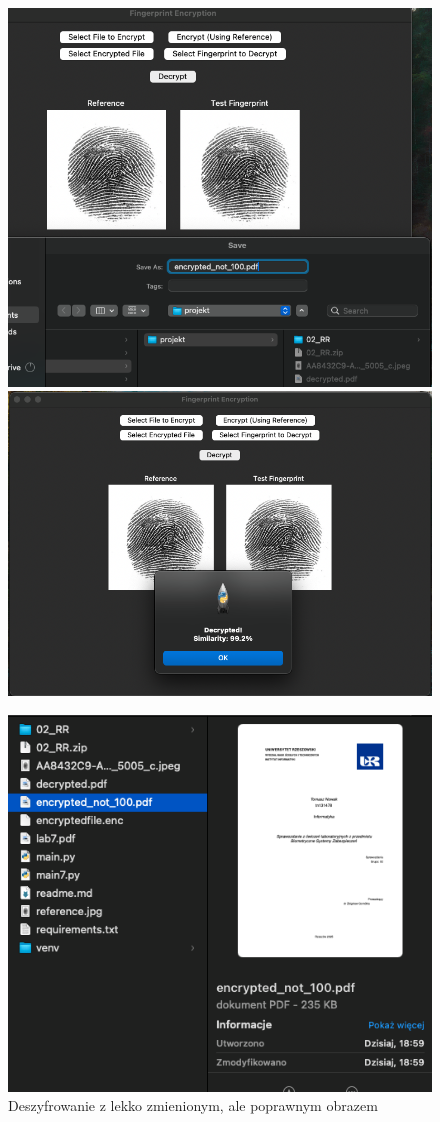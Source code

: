 \documentclass{urdpl}     %
\begin{document}
\begin{figure}[H]
	\centering
	\includegraphics[width=0.49\linewidth]{docs/decryptedWithChangedValidImage.png}
	\includegraphics[width=0.49\linewidth]{docs/decryptedWithChangedValidImageNotify.png}
	
	\vspace{0.5em}
	
	\includegraphics[width=0.85\linewidth]{docs/decryptedWithChangedValidImageFile.png}
	\caption*{Deszyfrowanie z lekko zmienionym, ale poprawnym obrazem}
\end{figure}
\end{document}

